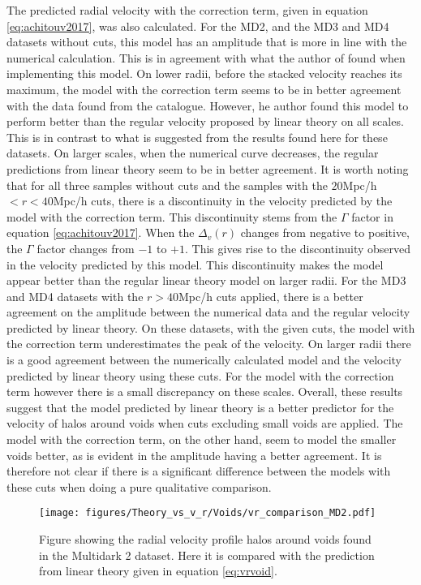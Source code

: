 The predicted radial velocity with the correction term, given in equation \ref{eq:achitouv2017}, was also calculated. For the MD2, and the MD3 and MD4 datasets without cuts, this model has an amplitude that is more in line with the numerical calculation. This is in agreement with what the author of \cite{Achitouv_streaming} found when implementing this model. On lower radii, before the stacked velocity reaches its maximum, the model with the correction term seems to be in better agreement with the data found from the catalogue. However, he author found this model to perform better than the regular velocity proposed by linear theory on all scales. This is in contrast to what is suggested from the results found here for these datasets. On larger scales, when the numerical curve decreases, the regular predictions from linear theory seem to be in better agreement. It is worth noting that for all three samples without cuts and the samples with the $20$Mpc/h$<r<40$Mpc/h cuts, there is a discontinuity in the velocity predicted by the model with the correction term. This discontinuity stems from the $\Gamma$ factor in equation \ref{eq:achitouv2017}. When the $\Delta_v(r)$ changes from negative to positive, the $\Gamma$ factor changes from $-1$ to $+1$. This gives rise to the discontinuity observed in the velocity predicted by this model. This discontinuity makes the model appear better than the regular linear theory model on larger radii. For the MD3 and MD4 datasets with the $r>40$Mpc/h cuts applied, there is a better agreement on the amplitude between the numerical data and the regular velocity predicted by linear theory. On these datasets, with the given cuts, the model with the correction term underestimates the peak of the velocity. On larger radii there is a good agreement between the numerically calculated model and the velocity predicted by linear theory using these cuts. For the model with the correction term however there is a small discrepancy on these scales. Overall, these results suggest that the model predicted by linear theory is a better predictor for the velocity of halos around voids when cuts excluding small voids are applied. The model with the correction term, on the other hand, seem to model the smaller voids better, as is evident in the amplitude having a better agreement. It is therefore not clear if there is a significant difference between the models with these cuts when doing a pure qualitative comparison.
\begin{figure}[H]
    \texttt{[image: figures/Theory\_vs\_v\_r/Voids/vr\_comparison\_MD2.pdf]}
    \caption{Figure showing the radial velocity profile halos around voids found in the Multidark 2 dataset. Here it is compared with the prediction from linear theory given in equation \ref{eq:vrvoid}.}
    \label{fig:vrMD2}
\end{figure}

